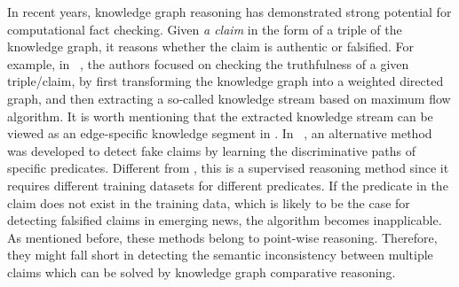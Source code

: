 In recent years, knowledge graph reasoning has demonstrated strong potential for computational fact checking. Given {\em a claim} in the form of a triple of the knowledge graph, it reasons whether the claim is authentic or falsified. For example, 
in ~\cite{Shiralkar2017}, the authors focused on checking the truthfulness of a given triple/claim, by first transforming the knowledge graph into a weighted directed graph, and then extracting a so-called knowledge stream based on maximum flow algorithm. %
It is worth mentioning that the extracted knowledge stream can be viewed as an edge-specific knowledge segment in \gchecker. 
In ~\cite{Shi2016dpp}, an alternative method was developed to detect fake claims by learning the discriminative paths of specific predicates. Different from \cite{Shiralkar2017}, this is a supervised reasoning method since 
it requires different training datasets for different predicates. 
If the predicate in the claim does not exist in the training data, which is likely to be the case for detecting falsified claims in emerging news, the algorithm becomes inapplicable.
 As mentioned before, these methods belong to point-wise reasoning. Therefore, %
 they might fall short in detecting the semantic inconsistency between multiple claims which can be solved by knowledge graph comparative reasoning.



